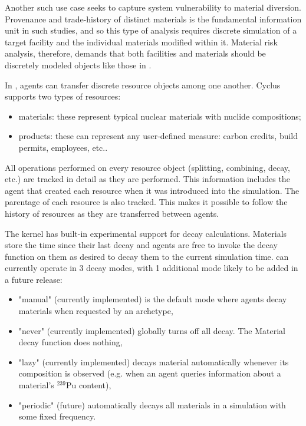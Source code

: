Another such use case seeks to capture system vulnerability to
material diversion. Provenance and trade-history of distinct materials is the fundamental
information unit in such studies, and so this type of analysis requires
 discrete simulation of a
target facility and the individual materials modified within it.
Material risk analysis, therefore, demands that both facilities and materials
should be discretely modeled objects like those in \Cyclus.

In \Cyclus, agents can transfer discrete resource objects among one another.
Cyclus supports two types of resources:

\begin{itemize}

  \item materials: these represent typical nuclear materials with
      nuclide compositions;

  \item products: these can represent any user-defined measure: carbon
      credits, build permits, employees, etc..

\end{itemize}

All operations performed on every resource object (splitting, combining,
decay, etc.) are tracked in detail as they are performed.  This information
includes the agent that created each resource when it was introduced into the
simulation.  The parentage of each resource is also tracked. This makes it
possible to follow the history of resources as they are transferred between
agents.

The \Cyclus kernel has built-in experimental support for decay calculations.
Materials store the time since their last decay and agents are free to
invoke the decay function on them as desired to decay them to the current
simulation time. \Cyclus can currently operate in 3 decay modes, with 1 additional
mode likely to be added in a future release:

\begin{itemize}
    \item "manual" (currently implemented) is the default mode
        where agents decay materials when requested by an archetype,
    \item "never" (currently implemented) globally turns off all decay.
        The Material decay function does nothing,
    \item "lazy" (currently implemented) decays material automatically whenever
         its composition is observed (e.g. when an agent queries information
         about a material's $^{239}$Pu content),
    \item "periodic" (future) automatically decays all materials in a
        simulation with some fixed frequency.
\end{itemize}


